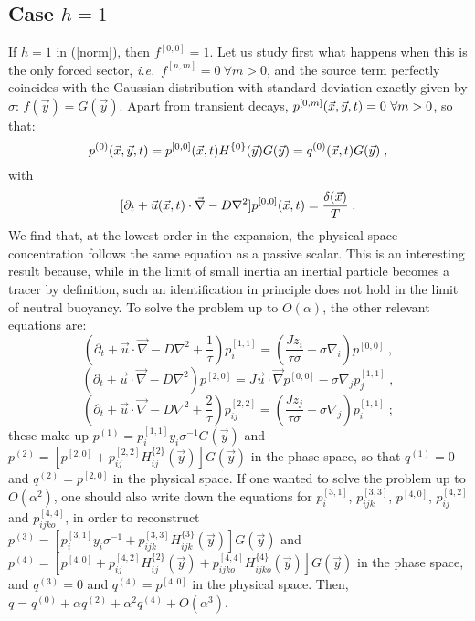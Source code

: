 \subsection{Case $h=1$} \label{c1}
%
If $h=1$ in (\ref{norm}), then $f^{[0,0]}=1$. Let us study first what happens when this is the only forced sector, \emph{i.e.}\ $f^{[n,m]}=0\ \forall m>0$,
and the source term perfectly coincides with the Gaussian distribution with standard deviation exactly given by $\sigma$: $f(\vec{y})=G(\vec{y})$.
Apart from transient decays, $p^{[0,m]}(\vec{x},\vec{y},t)=0\ \forall m>0$, so that:
\[p^{(0)}(\vec{x},\vec{y},t)=p^{[0,0]}(\vec{x},t)H^{\{0\}}(\vec{y})G(\vec{y})=q^{(0)}(\vec{x},t)G(\vec{y})\;,\]
with
\begin{equation} \label{nought}
 [\partial_t+\vec{u}(\vec{x},t)\cdot\vec{\nabla}-D\nabla^2]p^{[0,0]}(\vec{x},t)=\frac{\delta(\vec{x})}{T}\;.
\end{equation}
We find that, at the lowest order in the expansion, the physical-space concentration
follows the same equation as a passive scalar. This is an interesting result because,
while in the limit of small inertia an inertial particle becomes a tracer by definition,
such an identification in principle does not hold in the limit of neutral buoyancy.
To solve the problem up to $O(\alpha)$, the other relevant equations are:
\begin{equation} \label{11}
 \left(\partial_t+\vec{u}\cdot\vec{\nabla}-D\nabla^2+\frac{1}{\tau}\right)p^{[1,1]}_i=\left(\frac{Jz_i}{\tau\sigma}-\sigma\nabla_i\right)p^{[0,0]}\;,
\end{equation}
\begin{equation} \label{20}
 (\partial_t+\vec{u}\cdot\vec{\nabla}-D\nabla^2)p^{[2,0]}=J\vec{u}\cdot\vec{\nabla}p^{[0,0]}-\sigma\nabla_jp^{[1,1]}_j\;,
\end{equation}
\begin{equation} \label{22}
 \left(\partial_t+\vec{u}\cdot\vec{\nabla}-D\nabla^2+\frac{2}{\tau}\right)p^{[2,2]}_{ij}=\left(\frac{Jz_j}{\tau\sigma}-\sigma\nabla_j\right)p^{[1,1]}_i\;;
\end{equation}
these make up $p^{(1)}=p^{[1,1]}_iy_i\sigma^{-1}G(\vec{y})$ and $p^{(2)}=[p^{[2,0]}+p^{[2,2]}_{ij}H^{\{2\}}_{ij}(\vec{y})]G(\vec{y})$
in the phase space, so that $q^{(1)}=0$ and $q^{(2)}=p^{[2,0]}$ in the physical space. If one wanted to solve the problem up to $O(\alpha^2)$,
one should also write down the equations for $p^{[3,1]}_i$, $p^{[3,3]}_{ijk}$, $p^{[4,0]}$, $p^{[4,2]}_{ij}$ and $p^{[4,4]}_{ijko}$,
in order to reconstruct $p^{(3)}=[p^{[3,1]}_iy_i\sigma^{-1}+p^{[3,3]}_{ijk}H^{\{3\}}_{ijk}(\vec{y})]G(\vec{y})$ and
$p^{(4)}=[p^{[4,0]}+p^{[4,2]}_{ij}H^{\{2\}}_{ij}(\vec{y})+p^{[4,4]}_{ijko}H^{\{4\}}_{ijko}(\vec{y})]G(\vec{y})$ in the phase space,
and $q^{(3)}=0$ and $q^{(4)}=p^{[4,0]}$ in the physical space. Then, $q=q^{(0)}+\alpha q^{(2)}+\alpha^2 q^{(4)}+O(\alpha^3)$.
%
